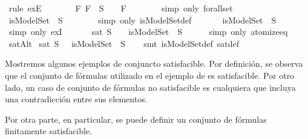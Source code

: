 \begin{isabellebody}
\ {\isacharparenleft}rule\ exE{\isacharparenright}\isanewline
\ \ \ \ \isamarkupfalse%
\ \isamarkupfalse%
\ {\isachardoublequoteopen}{\isasymforall}F{\isachardot}\ {\isacharparenleft}F\ {\isasymin}\ S\ {\isasymlongrightarrow}\ {\isasymA}\ {\isasymTurnstile}\ F{\isacharparenright}{\isachardoublequoteclose}\isanewline
\ \ \ \ \ \ \isamarkupfalse%
\ {\isacharparenleft}simp\ only{\isacharcolon}\ forall{\isacharunderscore}set{\isacharparenright}\isanewline
\ \ \ \ \isamarkupfalse%
\ \isamarkupfalse%
\ {\isachardoublequoteopen}isModelSet\ {\isasymA}\ S{\isachardoublequoteclose}\isanewline
\ \ \ \ \ \ \isamarkupfalse%
\ {\isacharparenleft}simp\ only{\isacharcolon}\ isModelSet{\isacharunderscore}def{\isacharparenright}\isanewline
\ \ \ \ \isamarkupfalse%
\ {\isachardoublequoteopen}{\isasymexists}{\isasymA}{\isachardot}\ isModelSet\ {\isasymA}\ S{\isachardoublequoteclose}\isanewline
\ \ \ \ \ \ \isamarkupfalse%
\ {\isacharparenleft}simp\ only{\isacharcolon}\ exI{\isacharparenright}\isanewline
\ \ \isamarkupfalse%
\isanewline
\ \ \isamarkupfalse%
\ {\isachardoublequoteopen}sat\ S\ \ {\isasymequiv}\ {\isasymexists}{\isasymA}{\isachardot}\ isModelSet\ {\isasymA}\ S{\isachardoublequoteclose}\isanewline
\ \ \ \ \isamarkupfalse%
\ {\isacharparenleft}simp\ only{\isacharcolon}\ atomize{\isacharunderscore}eq{\isacharparenright}\isanewline
{}\isamarkupfalse%
%
\endisatagproof
{\isafoldproof}%
%
\isadelimproof
\isanewline
%
\endisadelimproof
\isanewline
{}\isamarkupfalse%
\ satAlt{\isacharcolon}\isanewline
\ {\isachardoublequoteopen}sat\ S\ {\isasymequiv}\ {\isasymexists}{\isasymA}{\isachardot}\ isModelSet\ {\isasymA}\ S{\isachardoublequoteclose}\isanewline
%
\isadelimproof
\ \ %
\endisadelimproof
%
\isatagproof
{}\isamarkupfalse%
\ {\isacharparenleft}smt\ isModelSet{\isacharunderscore}def\ sat{\isacharunderscore}def{\isacharparenright}%
\endisatagproof
{\isafoldproof}%
%
\isadelimproof
%
\endisadelimproof
%
\begin{isamarkuptext}%
Mostremos algunos ejemplos de conjuncto satisfacible. Por 
  definición, se observa que el conjunto de fórmulas utilizado 
  en el ejemplo de  es satisfacible. Por otro lado, un 
  caso de conjunto de fórmulas no satisfacible es cualquiera que 
  incluya una contradicción entre sus elementos.
  
  Por otra parte, en particular, se puede definir un conjunto de 
  fórmulas finitamente satisfacible.


\end{isamarkuptext}
\end{isabellebody}
